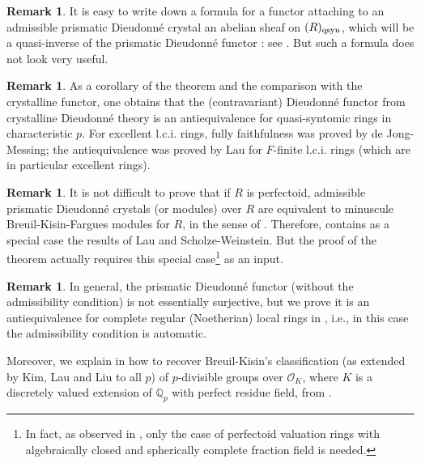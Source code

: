\documentclass{amsart}
\theoremstyle{plain}
\theoremstyle{definition}
\newtheorem{remark}[theorem]{Remark}
\newcommand{\purple}[1]{{\color{black} #1}}
\newcommand{\red}[1]{{\color{black} #1}}
\newcommand{\blue}[1]{{\color{black}#1}}
\begin{document}
\begin{remark}
It is easy to write down a formula for a functor attaching to \red{an admissible} prismatic Dieudonn\'e crystal an abelian sheaf on $(R)_{\rm qsyn}$, which will be a quasi-inverse of the prismatic Dieudonn\'e functor : see . But such a formula does not look very useful.
\end{remark}


\begin{remark}
As a corollary of the theorem and the comparison with the crystalline functor, one obtains that the (contravariant) Dieudonn\'e functor from crystalline Dieudonn\'e theory is an antiequivalence for quasi-syntomic rings in characteristic $p$. For excellent l.c.i. rings, fully faithfulness was proved by de Jong-Messing; the antiequivalence was proved by Lau for $F$-finite l.c.i. rings (which are in particular excellent rings). 
\end{remark}

\begin{remark}
\purple{It is not difficult to prove that if $R$ is perfectoid, \red{admissible} prismatic Dieudonn\'e crystals (or modules) over $R$ are equivalent to minuscule Breuil-Kisin-Fargues modules for $R$, in the sense of \cite{bhatt_morrow_scholze_integral_p_adic_hodge_theory}.
Therefore, \Cref{sec:intro-main-theorem-2} contains as a special case the results of Lau and Scholze-Weinstein. But the proof of the theorem actually requires this special case\footnote{In fact, as observed in \cite{scholze2020berkeley}, only the case of perfectoid valuation rings with algebraically closed and spherically complete fraction field is needed.} as an input.}
\end{remark}

\begin{remark}
In general, the prismatic Dieudonn\'e functor (without the \red{admissibility condition}) is not essentially surjective, but we prove it is an antiequivalence for \blue{complete regular (Noetherian) local} rings in , \red{i.e., in this case the admissibility condition is automatic}.

Moreover, we explain in  how to recover Breuil-Kisin's classification (as extended by Kim, Lau and Liu to all $p$) of $p$-divisible groups over $\mathcal{O}_K$, where $K$ is a discretely valued extension of $\mathbb{Q}_p$ with perfect residue field, from .
\end{remark} 
\end{document}
